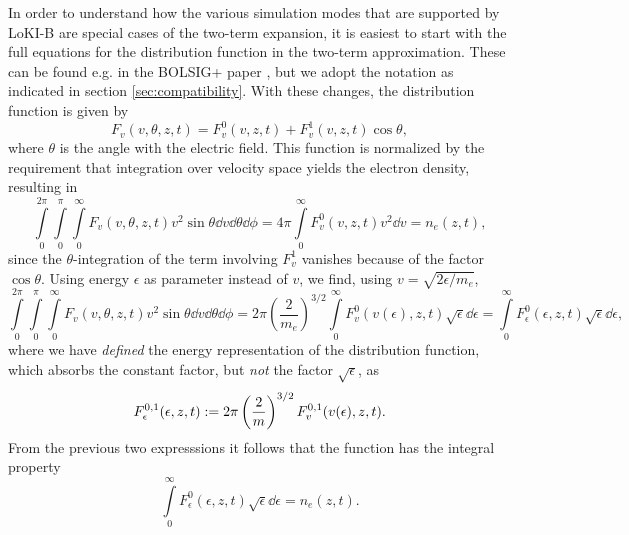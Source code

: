 \documentclass{book}
\begin{document}
In order to understand how the various simulation modes that are supported by
LoKI-B are special cases of the two-term expansion, it is easiest to start with
the full equations for the distribution function in the two-term approximation.
These can be found e.g. in the BOLSIG+ paper \cite[eq. 3--6]{Hagelaar2005},
but we adopt the notation as indicated in section \ref{sec:compatibility}.
With these changes, the distribution function is given by
\begin{equation}
	F_v(v,\theta,z,t) = F^0_v(v,z,t) + F^1_v(v,z,t)\cos\theta,
	\label{eq:Fv(Fv0,Fv1)}
\end{equation}
where $\theta$ is the angle with the electric field. This function is normalized by
the requirement that integration over velocity space yields the electron density,
resulting in
\begin{equation}
	\int\limits_0^{2\pi}\int\limits_0^\pi\int\limits_0^\infty F_v(v,\theta,z,t)v^2\sin\theta\dd{v}\dd{\theta}\dd{\phi}
	= 4\pi\int\limits_0^\infty F^0_v(v,z,t)v^2\dd{v}
	=n_e(z,t),
	\label{eq:Fv-norm-vel}
\end{equation}
since the $\theta$-integration of the term involving $F^1_v$ vanishes because of
the factor $\cos\theta$. Using energy $\epsilon$ as parameter instead of $v$, we
find, using $v=\sqrt{2\epsilon/m_e}$,
\begin{equation}
	\int\limits_0^{2\pi}\int\limits_0^\pi\int\limits_0^\infty F_v(v,\theta,z,t)v^2\sin\theta\dd{v}\dd{\theta}\dd{\phi}
	= 2\pi\left(\frac{2}{m_e}\right)^{3/2}\int\limits_0^\infty F^0_v(v(\epsilon),z,t)\sqrt{\epsilon}\dd{\epsilon}
	= \int\limits_0^\infty F^0_\epsilon(\epsilon,z,t)\sqrt{\epsilon}\dd{\epsilon},
	\label{eq:Fv-norm-eps}
\end{equation}
where we have {\em defined} the energy representation of the distribution function, which absorbs
the constant factor, but {\em not} the factor $\sqrt{\epsilon}$, as
\begin{equation}
	F^{0,1}_\epsilon(\epsilon,z,t)
	:=
	2\pi \left(\frac{2}{m}\right)^{3/2}F^{0,1}_v(v(\epsilon),z,t).
	\label{eq:F^{0,1}_eps(eps)}
\end{equation}
From the previous two expresssions it follows that the function has the integral property
\begin{equation}
	\int\limits_0^\infty F^0_\epsilon(\epsilon,z,t)\sqrt{\epsilon}\dd{\epsilon}=n_e(z,t).
	\label{eq:F0eps-norm}
\end{equation}
\end{document}
